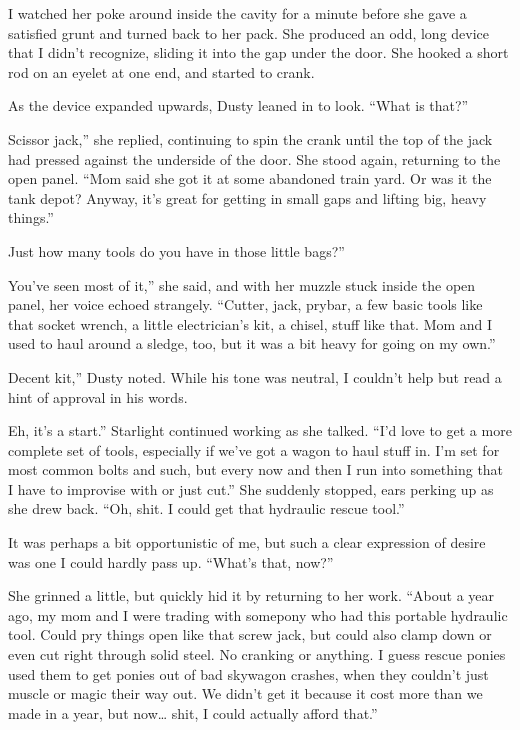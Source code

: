 I watched her poke around inside the cavity for a minute before she gave a satisfied grunt and turned back to her pack. She produced an odd, long device that I didn’t recognize, sliding it into the gap under the door. She hooked a short rod on an eyelet at one end, and started to crank.

As the device expanded upwards, Dusty leaned in to look. “What is that?”

\leavevmode{}Scissor jack,” she replied, continuing to spin the crank until the top of the jack had pressed against the underside of the door. She stood again, returning to the open panel. “Mom said she got it at some abandoned train yard. Or was it the tank depot? Anyway, it’s great for getting in small gaps and lifting big, heavy things.”

\leavevmode{}Just how many tools do you have in those little bags?”

\leavevmode{}You’ve seen most of it,” she said, and with her muzzle stuck inside the open panel, her voice echoed strangely. “Cutter, jack, prybar, a few basic tools like that socket wrench, a little electrician’s kit, a chisel, stuff like that. Mom and I used to haul around a sledge, too, but it was a bit heavy for going on my own.”

\leavevmode{}Decent kit,” Dusty noted. While his tone was neutral, I couldn’t help but read a hint of approval in his words.

\leavevmode{}Eh, it’s a start.” Starlight continued working as she talked. “I’d love to get a more complete set of tools, especially if we’ve got a wagon to haul stuff in. I’m set for most common bolts and such, but every now and then I run into something that I have to improvise with or just cut.” She suddenly stopped, ears perking up as she drew back. “Oh, shit. I could get that hydraulic rescue tool.”

It was perhaps a bit opportunistic of me, but such a clear expression of desire was one I could hardly pass up. “What’s that, now?”

She grinned a little, but quickly hid it by returning to her work. “About a year ago, my mom and I were trading with somepony who had this portable hydraulic tool. Could pry things open like that screw jack, but could also clamp down or even cut right through solid steel. No cranking or anything. I guess rescue ponies used them to get ponies out of bad skywagon crashes, when they couldn’t just muscle or magic their way out. We didn’t get it because it cost more than we made in a year, but now… shit, I could actually afford that.”

